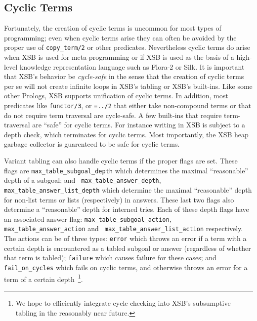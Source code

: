 \subsection{Cyclic Terms}
%
    Fortunately, the creation of cyclic terms is uncommon for most
    types of programming; even when cyclic terms arise they can often
    be avoided by the proper use of {\tt copy\_term/2} or other
    predicates.  Nevertheless cyclic terms do arise when XSB is used
    for meta-programming or if XSB is used as the basis of a
    high-level knowledge representation language such as Flora-2 or
    Silk.  It is important that XSB's behavior be {\em cycle-safe} in
    the sense that the creation of cyclic terms per se will not create
    infinite loops in XSB's tabling or XSB's built-ins.  Like some
    other Prologs, XSB supports unification of cyclic terms.  In
    addition, most predicates like {\tt functor/3}, or {\tt =../2}
    that either take non-compound terms or that do not require term
    traversal are cycle-safe.  A few built-ins that require
    term-traversal are ``safe'' for cyclic terms.  For instance
    writing in XSB is subject to a depth check, which terminates for
    cyclic terms.  Most importantly, the XSB heap garbage collector is
    guarenteed to be safe for cyclic terms.

    Variant tabling can also handle cyclic terms if the proper flags
    are set.  These flags are {\tt max\_table\_subgoal\_depth} which
    determines the maximal ``reasonable'' depth of a subgoal; and {\tt
      max\_table\_answer\_depth}, {\tt
      max\_table\_answer\_list\_depth} which determine the maximal
    ``reasonable'' depth for non-list terms or lists (respectively) in
    answers.  These last two flags also determine a ``reasonable''
    depth for interned tries.  Each of these depth flags have an
    associated answer flag: {\tt max\_table\_subgoal\_action}, {\tt
      max\_table\_answer\_action} and {\tt
      max\_table\_answer\_list\_action} respectively.  The actions can
    be of three types: {\tt error} which throws an error if a term
    with a certain depth is encountered as a tabled subgoal or answer
    (regardless of whether that term is tabled); {\tt failure} which
    causes failure for these cases; and {\tt fail\_on\_cycles} which
    fails on cyclic terms, and otherwise throws an error for a term of
    a certain depth~\footnote{We hope to efficiently integrate cycle
      checking into XSB's subsumptive tabling in the reasonably near
      future.}.

